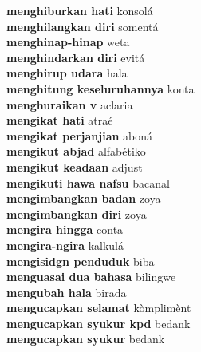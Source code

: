 \textbf{ menghiburkan hati  } konsolá \\
\textbf{ menghilangkan diri  } somentá \\
\textbf{ menghinap-hinap  } weta \\
\textbf{ menghindarkan diri  } evitá \\
\textbf{ menghirup udara  } hala \\
\textbf{ menghitung keseluruhannya  } konta \\
\textbf{ menghuraikan v  } aclaria \\
\textbf{ mengikat hati  } atraé \\
\textbf{ mengikat perjanjian  } aboná \\
\textbf{ mengikut abjad  } alfabétiko \\
\textbf{ mengikut keadaan  } adjust \\
\textbf{ mengikuti hawa nafsu  } bacanal \\
\textbf{ mengimbangkan badan  } zoya \\
\textbf{ mengimbangkan diri  } zoya \\
\textbf{ mengira hingga  } conta \\
\textbf{ mengira-ngira  } kalkulá \\
\textbf{ mengisidgn penduduk  } biba \\
\textbf{ menguasai dua bahasa  } bilingwe \\
\textbf{ mengubah hala  } birada \\
\textbf{ mengucapkan selamat  } kòmplimènt \\
\textbf{ mengucapkan syukur kpd  } bedank \\
\textbf{ mengucapkan syukur  } bedank \\
